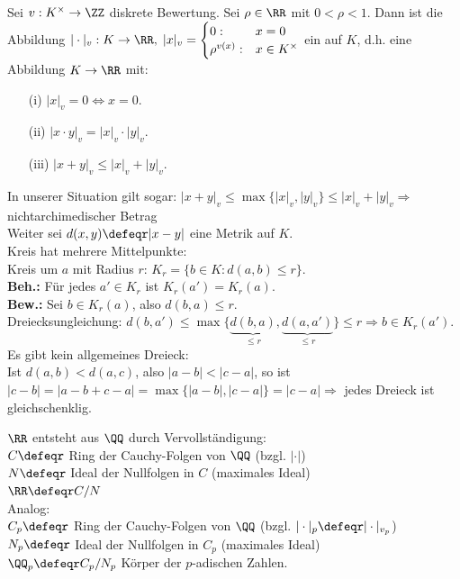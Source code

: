 \begin{Bem} 
Sei $v: K^{\times} \to \ZZ$ diskrete Bewertung.
Sei $\rho \in \RR$ mit $0 < \rho < 1$.
Dann ist die Abbildung $|\cdot|_v: K \to \RR, \; |x|_v = \begin{cases}0: & x
= 0 \\\rho^{v(x)}: & x \in K^{\times}\end{cases}$ ein
 auf $K$, d.h. eine Abbildung $K \to
\RR$ mit:
\begin{enumerate}
  \item[(i)] $|x|_v = 0 \Leftrightarrow x = 0$.
  \item[(ii)] $|x \cdot y|_v = |x|_v \cdot |y|_v$.
  \item[(iii)] $|x + y|_v \leq |x|_v + |y|_v$.
\end{enumerate}
In unserer Situation gilt sogar: $|x + y|_v \leq \max\{|x|_v,|y|_v\} \leq |x|_v
+ |y|_v \Rightarrow$ \glqq nichtarchimedischer Betrag\grqq\\
Weiter sei $d(x,y) \defeqr|x - y|$ eine Metrik auf $K$.\\
Kreis hat mehrere Mittelpunkte:\\
Kreis um $a$ mit Radius $r$: $K_r = \{b \in K: d(a,b) \leq r\}$.\\
\textbf{Beh.:} Für jedes $a' \in K_r$ ist $K_r(a') = K_r(a)$.\\
\textbf{Bew.:} Sei $b \in K_r(a)$, also $d(b,a) \leq r$.\\
Dreiecksungleichung: $d(b,a') \leq \max\{\underset{\leq
r}{\underbrace{d(b,a)}},\underset{\leq r}{\underbrace{d(a,a')}}\} \leq r \Rightarrow b \in
K_r(a')$.\\
Es gibt kein allgemeines Dreieck:\\
Ist $d(a,b) < d(a,c)$, also $|a-b| < |c-a|$, so ist $|c-b| = |a-b+c-a| =
\max\{|a-b|,|c-a|\} = |c-a| \Rightarrow$ jedes Dreieck ist gleichschenklig.
\end{Bem}

\begin{Eri}
$\RR$ entsteht aus $\QQ$ durch \glqq Vervollständigung\grqq:\\
$C \defeqr$ Ring der Cauchy-Folgen von $\QQ$ (bzgl. $|\cdot|$)\\
$N \defeqr$ Ideal der Nullfolgen in $C$ (maximales Ideal)\\
$\RR \defeqr C/N$\\
Analog:\\
$C_p \defeqr$ Ring der Cauchy-Folgen von $\QQ$ (bzgl. $|\cdot|_p \defeqr
|\cdot|_{v_p}$)\\
$N_p \defeqr$ Ideal der Nullfolgen in $C_p$ (maximales Ideal)\\
$\QQ_p \defeqr C_p/N_p$ \glqq Körper der $p$-adischen Zahlen\grqq.
\end{Eri}

